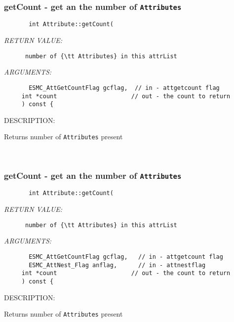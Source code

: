 \mbox{}\hrulefill\
 
\subsubsection [getCount] {getCount - get an the number of {\tt Attributes}}


   
\begin{verbatim}       int Attribute::getCount(
   \end{verbatim}{\em RETURN VALUE:}
\begin{verbatim}      number of {\tt Attributes} in this attrList
   \end{verbatim}{\em ARGUMENTS:}
\begin{verbatim}       ESMC_AttGetCountFlag gcflag,  // in - attgetcount flag
     int *count                     // out - the count to return
     ) const {\end{verbatim}
{\sf DESCRIPTION:\\ }


        Returns number of {\tt Attributes} present
   
 
\mbox{}\hrulefill\
 
\subsubsection [getCount] {getCount - get an the number of {\tt Attributes}}


  
\begin{verbatim}       int Attribute::getCount(\end{verbatim}{\em RETURN VALUE:}
\begin{verbatim}      number of {\tt Attributes} in this attrList\end{verbatim}{\em ARGUMENTS:}
\begin{verbatim}       ESMC_AttGetCountFlag gcflag,   // in - attgetcount flag
       ESMC_AttNest_Flag anflag,      // in - attnestflag
     int *count                     // out - the count to return
     ) const {\end{verbatim}
{\sf DESCRIPTION:\\ }


        Returns number of {\tt Attributes} present
   
 
